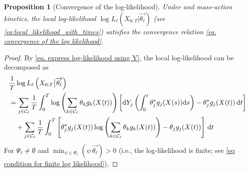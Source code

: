 \documentclass[pdflatex,sn-mathphys-num]{sn-jnl}%
\def\dd{\text{d}}
\theoremstyle{thmstyleone}%
\newtheorem{proposition}[theorem]{Proposition}%
\theoremstyle{thmstyletwo}%
\theoremstyle{thmstylethree}%
\begin{document}
\begin{appendices}
\begin{proposition}[Convergence of the log-likelihood]\label{Proposition convergence of the log-likelihood}
    Under  and mass-action kinetics, the local log-likelihood $\log L_\ell\left(X_{0:T}\big|\overrightarrow{\theta_\ell}\right)$ (see \eqref{eq:local_likelihood_with_times}) satisfies the convergence relation \eqref{eq. convergence of the log likelihood}.
\end{proposition}

\begin{proof}
    By \eqref{eq. express log-likelihood using Y}, the local log-likelihood can be decomposed as 
    \begin{align}
        &\frac{1}{T}\log L_\ell\left(X_{0:T}\big|\overrightarrow{\theta_\ell}\right) \notag\\
        &= \sum_{j\in\mathcal C_\ell} \frac{1}{T}\int_{0}^T \log\left(\sum_{k\in\mathcal C_\ell} \theta_k g_k(X(t))\right) 
        \left[
        \dd Y_j\left(\int_0^t \theta^*_j g_j(X(s)) \dd s\right)
        - \theta^*_j g_j(X(t)) \, \dd t
        \right] \notag\\
        & \quad + 
        \sum_{j\in\mathcal C_\ell} \frac{1}{T}\int_{0}^T 
        \left[
        \theta^*_j g_j(X(t)) \log\left(\sum_{k\in\mathcal C_\ell} \theta_k g_k(X(t))\right) 
        -
        \theta_j g_j(X(t))
        \right] \, \dd t 
        \label{eq. proof of the log likelihood convergence}
    \end{align}
    For $\Psi_\ell \neq \emptyset$ and $\min_{\psi\in\Psi_\ell} \left(\psi \, \overrightarrow{\theta_\ell}\right) > 0$ (i.e., the log-likelihood is finite; see \eqref{eq condition for finite log likelihood}),

\end{proof}
\end{appendices}
\end{document}
